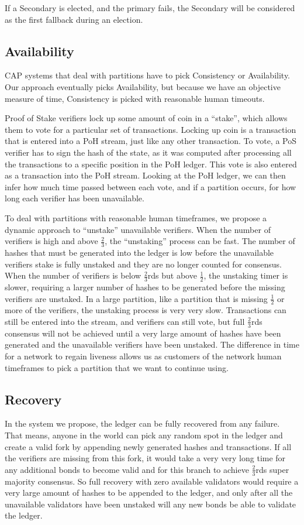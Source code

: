 \documentclass[12pt]{ltjsarticle}
\begin{document}
If a Secondary is elected, and the primary fails, the Secondary will be considered as the first fallback during an election.

\subsection{Availability}\label{availability}
CAP systems that deal with partitions have to pick Consistency or Availability. Our approach eventually picks Availability, but because we have an objective measure of time, Consistency is picked with reasonable human timeouts.

Proof of Stake verifiers lock up some amount of coin in a “stake”, which allows them to vote for a particular set of transactions. Locking up coin is a transaction that is entered into a PoH stream, just like any other transaction. To vote, a PoS verifier has to sign the hash of the state, as it was computed after processing all the transactions to a specific position in the PoH ledger. This vote is also entered as a transaction into the PoH stream. Looking at the PoH ledger, we can then infer how much time passed between each vote, and if a partition occurs, for how long each verifier has been unavailable.

To deal with partitions with reasonable human timeframes, we propose a dynamic approach to “unstake” unavailable verifiers. When the number of verifiers is high and above \(\frac{2}{3}\), the “unstaking” process can be fast. The number of hashes that must be generated into the ledger is low before the unavailable verifiers stake is fully unstaked and they are no longer counted for consensus. When the number of verifiers is below \(\frac{2}{3}\)rds but above \(\frac{1}{2}\), the unstaking timer is slower, requiring a larger number of hashes to be generated before the missing verifiers are unstaked. In a large partition, like a partition that is missing \(\frac{1}{2}\) or more of the verifiers, the unstaking process is very very slow. Transactions can still be entered into the stream, and verifiers can still vote, but full \(\frac{2}{3}\)rds consensus will not be achieved until a very large amount of hashes have been generated and the unavailable verifiers have been unstaked. The difference in time for a network to regain liveness allows us as customers of the network human timeframes to pick a partition that we want to continue using.

\subsection{Recovery}\label{availability}
In the system we propose, the ledger can be fully recovered from any failure. That means, anyone in the world can pick any random spot in the ledger and create a valid fork by appending newly generated hashes and transactions. If all the verifiers are missing from this fork, it would take a very very long time for any additional bonds to become valid and for this branch to achieve \(\frac{2}{3}\)rds super majority consensus. So full recovery with zero available validators would require a very large amount of hashes to be appended to the ledger, and only after all the unavailable validators have been unstaked will any new bonds be able to validate the ledger.
\end{document}
